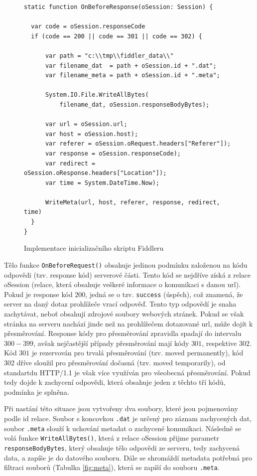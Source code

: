 \documentclass[thesis=M,czech,hidelinks]{FITthesis}[2013/05/06]
\begin{document}
\begin{figure}[h]               
	\begin{verbatim}
static function OnBeforeResponse(oSession: Session) {

  var code = oSession.responseCode
  if (code == 200 || code == 301 || code == 302) {

      var path = "c:\\tmp\\fiddler_data\\"
      var filename_dat  = path + oSession.id + ".dat";
      var filename_meta = path + oSession.id + ".meta";

      System.IO.File.WriteAllBytes(
          filename_dat, oSession.responseBodyBytes);
       
      var url = oSession.url;
      var host = oSession.host);
      var referer = oSession.oRequest.headers["Referer"]);
      var response = oSession.responseCode);
      var redirect = oSession.oResponse.headers["Location"]);
      var time = System.DateTime.Now);
      
      WriteMeta(url, host, referer, response, redirect, time)
  }
}
	\end{verbatim}      
	\caption{Implementace inicializačního skriptu Fiddleru}
	\label{snip:fiddler}
\end{figure}

Tělo funkce \texttt{OnBeforeRequest()} obsahuje jedinou podmínku založenou na kódu odpovědi (tzv. response kód) serverové části. Tento kód se nejdříve získá z relace oSession (relace, která obsahuje veškeré informace o komunikaci s danou url). Pokud je response kód $200$, jedná se o tzv. \texttt{success} (úspěch), což znamená, že server na daný dotaz prohlížeče vrací odpověď. Tento typ odpovědí je snaha zachytávat, neboť obsahují zdrojové soubory webových stránek. Pokud se však stránka na serveru nachází jinde než na prohlížečem dotazované url, může dojít k přesměrování. Response kódy pro přesměrování zpravidla spadají do intervalu $300-399$, avšak nejčastější případy přesměrování mají kódy $301$, respektive $302$. Kód $301$ je rezervován pro trvalá přesměrování (tzv. moved permanently), kód $302$ dříve sloužil pro přesměrování dočasná (tzv. moved temporarily), od standartdu HTTP/1.1 je však více využíván pro všeobecná přesměrování\cite{response_codes}. Pokud tedy dojde k zachycení odpovědi, která obsahuje jeden z těchto tří kódů, podmínka je splněna.

Při nastání této situace jsou vytvořeny dva soubory, které jsou pojmenovány podle id relace. Soubor s koncovkou \texttt{.dat} je určený pro záznam zachycených dat, soubor \texttt{.meta} slouží k uchování metadat o zachycené komunikaci. Následně se volá funkce \texttt{WriteAllBytes()}, která z relace oSession přijme parametr \texttt{responseBodyBytes}, který obsahuje tělo odpovědi ze serveru, tedy zachycená data, a zapíše je do datového souboru. Dále se shromáždí metadata potřebná pro filtraci souborů (Tabulka \ref{fig:meta}), která se zapíší do souboru \texttt{.meta}. 
\end{document}
